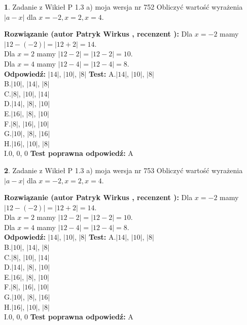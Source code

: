 \documentclass[12pt, a4paper]{article}
\theoremstyle{definition} %
\newtheorem{zad}{}
\newcommand{\zadStart}[1]{\begin{zad}#1\newline}
\newcommand{\zadStop}{\end{zad}}
\newcommand{\rozwStart}[2]{\noindent \textbf{Rozwiązanie (autor #1 , recenzent #2): }\newline}
\newcommand{\rozwStop}{\newline}
\newcommand{\odpStart}{\noindent \textbf{Odpowiedź:}\newline}
\newcommand{\odpStop}{\newline}
\newcommand{\testStart}{\noindent \textbf{Test:}\newline}
\newcommand{\testStop}{\newline}
\newcommand{\kluczStart}{\noindent \textbf{Test poprawna odpowiedź:}\newline}
\newcommand{\kluczStop}{\newline}
\begin{document}
\zadStart{Zadanie z Wikieł P 1.3 a) moja wersja nr 752}
Obliczyć wartość wyrażenia $|a - x|$ dla $x=-2,x=2,x=4$.
\zadStop
\rozwStart{Patryk Wirkus}{}
Dla $x = -2$ mamy $|12 - (-2)| = |12 + 2| = 14$.\\
Dla $x = 2$ mamy $|12 - 2| = |12 - 2| = 10$.\\
Dla $x = 4$ mamy $|12 - 4| = |12 - 4| = 8$.\\
\rozwStop
\odpStart
$|14|$, $|10|$, $|8|$
\odpStop
\testStart
A.$|14|$, $|10|$, $|8|$\\
B.$|10|$, $|14|$, $|8|$\\
C.$|8|$, $|10|$, $|14|$\\
D.$|14|$, $|8|$, $|10|$\\
E.$|16|$, $|8|$, $|10|$\\
F.$|8|$, $|16|$, $|10|$\\
G.$|10|$, $|8|$, $|16|$\\
H.$|16|$, $|10|$, $|8|$\\
I.$0$, $0$, $0$
\testStop
\kluczStart
A
\kluczStop



\zadStart{Zadanie z Wikieł P 1.3 a) moja wersja nr 753}
Obliczyć wartość wyrażenia $|a - x|$ dla $x=-2,x=2,x=4$.
\zadStop
\rozwStart{Patryk Wirkus}{}
Dla $x = -2$ mamy $|12 - (-2)| = |12 + 2| = 14$.\\
Dla $x = 2$ mamy $|12 - 2| = |12 - 2| = 10$.\\
Dla $x = 4$ mamy $|12 - 4| = |12 - 4| = 8$.\\
\rozwStop
\odpStart
$|14|$, $|10|$, $|8|$
\odpStop
\testStart
A.$|14|$, $|10|$, $|8|$\\
B.$|10|$, $|14|$, $|8|$\\
C.$|8|$, $|10|$, $|14|$\\
D.$|14|$, $|8|$, $|10|$\\
E.$|16|$, $|8|$, $|10|$\\
F.$|8|$, $|16|$, $|10|$\\
G.$|10|$, $|8|$, $|16|$\\
H.$|16|$, $|10|$, $|8|$\\
I.$0$, $0$, $0$
\testStop
\kluczStart
A
\kluczStop
\end{document}
